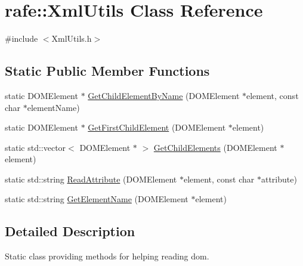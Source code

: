\hypertarget{classrafe_1_1_xml_utils}{\section{rafe\+:\+:Xml\+Utils Class Reference}
\label{classrafe_1_1_xml_utils}
}


{\ttfamily \#include $<$Xml\+Utils.\+h$>$}

\subsection*{Static Public Member Functions}
\begin{DoxyCompactItemize}
\item 
static D\+O\+M\+Element $\ast$ \hyperlink{classrafe_1_1_xml_utils_ae1b1eeb3eb9be629b44feeb56d9c0c41}{Get\+Child\+Element\+By\+Name} (D\+O\+M\+Element $\ast$element, const char $\ast$element\+Name)
\item 
static D\+O\+M\+Element $\ast$ \hyperlink{classrafe_1_1_xml_utils_affca10b23b38714de1cd5970d9a79095}{Get\+First\+Child\+Element} (D\+O\+M\+Element $\ast$element)
\item 
static std\+::vector$<$ D\+O\+M\+Element $\ast$ $>$ \hyperlink{classrafe_1_1_xml_utils_a34585b50c6847dd466ea6e1bc265dd23}{Get\+Child\+Elements} (D\+O\+M\+Element $\ast$element)
\item 
static std\+::string \hyperlink{classrafe_1_1_xml_utils_ada4e8422abdedf695f575c7e850ced58}{Read\+Attribute} (D\+O\+M\+Element $\ast$element, const char $\ast$attribute)
\item 
static std\+::string \hyperlink{classrafe_1_1_xml_utils_aade3e2435e54b3682d6465427cfb0acb}{Get\+Element\+Name} (D\+O\+M\+Element $\ast$element)
\end{DoxyCompactItemize}


\subsection{Detailed Description}
Static class providing methods for helping reading dom. 

